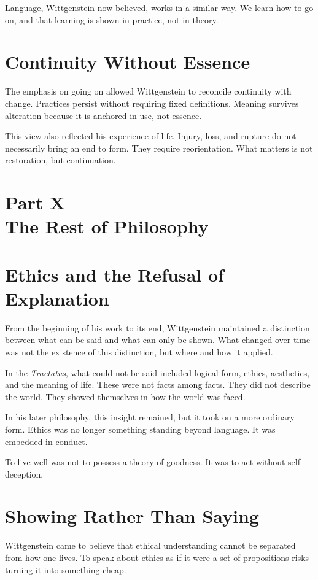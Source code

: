 \documentclass[11pt]{article}
\begin{document}
Language, Wittgenstein now believed, works in a similar way. We learn how to go on, and that learning is shown in practice, not in theory.

\section*{Continuity Without Essence}

The emphasis on going on allowed Wittgenstein to reconcile continuity with change. Practices persist without requiring fixed definitions. Meaning survives alteration because it is anchored in use, not essence.

This view also reflected his experience of life. Injury, loss, and rupture do not necessarily bring an end to form. They require reorientation. What matters is not restoration, but continuation.

\newpage
\section*{Part X \\ The Rest of Philosophy}

\section*{Ethics and the Refusal of Explanation}

From the beginning of his work to its end, Wittgenstein maintained a distinction between what can be said and what can only be shown. What changed over time was not the existence of this distinction, but where and how it applied.

In the \emph{Tractatus}, what could not be said included logical form, ethics, aesthetics, and the meaning of life. These were not facts among facts. They did not describe the world. They showed themselves in how the world was faced.

In his later philosophy, this insight remained, but it took on a more ordinary form. Ethics was no longer something standing beyond language. It was embedded in conduct.

To live well was not to possess a theory of goodness. It was to act without self-deception.

\section*{Showing Rather Than Saying}

Wittgenstein came to believe that ethical understanding cannot be separated from how one lives. To speak about ethics as if it were a set of propositions risks turning it into something cheap.
\end{document}
